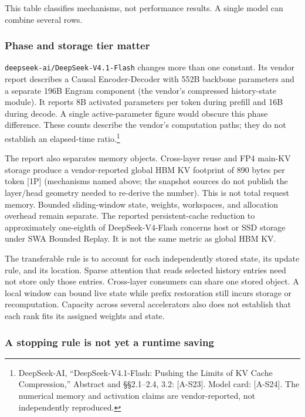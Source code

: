 This table classifies mechanisms, not performance results. A single
model can combine several rows.

\subsubsection*{Phase and storage tier
matter}\label{phase-and-storage-tier-matter}

\texttt{deepseek-ai/DeepSeek-V4.1-Flash} changes more than one constant.
Its vendor report describes a Causal Encoder-Decoder with 552B backbone
parameters and a separate 196B Engram component (the vendor's compressed
history-state module). It reports 8B activated parameters per token
during prefill and 16B during decode. A single active-parameter figure
would obscure this phase difference. These counts describe the vendor's
computation paths; they do not establish an elapsed-time
ratio.\footnote{DeepSeek-AI, ``DeepSeek-V4.1-Flash: Pushing the Limits
  of KV Cache Compression,'' Abstract and §§2.1--2.4, 3.2: \mbox{{[}A-S23{]}}.
  Model card: \mbox{{[}A-S24{]}}. The numerical memory and activation claims
  are vendor-reported, not independently reproduced.}

The report also separates memory objects. Cross-layer reuse and FP4
main-KV storage produce a vendor-reported global HBM KV footprint of 890
bytes per token \mbox{{[}1P{]}} (mechanisms named above; the snapshot sources
do not publish the layer/head geometry needed to re-derive the number).
This is not total request memory. Bounded sliding-window state, weights,
workspaces, and allocation overhead remain separate. The reported
persistent-cache reduction to approximately one-eighth of
DeepSeek-V4-Flash concerns host or SSD storage under SWA Bounded Replay.
It is not the same metric as global HBM KV.

The transferable rule is to account for each independently stored state,
its update rule, and its location. Sparse attention that reads selected
history entries need not store only those entries. Cross-layer consumers
can share one stored object. A local window can bound live state while
prefix restoration still incurs storage or recomputation. Capacity
across several accelerators also does not establish that each rank fits
its assigned weights and state.

\subsubsection*{A stopping rule is not yet a runtime
saving}\label{a-stopping-rule-is-not-yet-a-runtime-saving}

